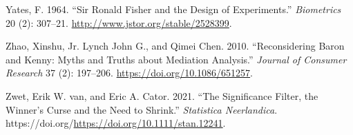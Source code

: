 \documentclass[
  11pt,
  letterpaper,
]{scrbook}
\newlength{\cslhangindent}
\newlength{\cslentryspacingunit} %
\newenvironment{CSLReferences}[2] %
 {%
  \setlength{\parindent}{0pt}
  \ifodd #1
  \let\oldpar\par
  \def\par{\hangindent=\cslhangindent\oldpar}
  \fi
  \setlength{\parskip}{#2\cslentryspacingunit}
 }%
 {}
\theoremstyle{definition}
\theoremstyle{remark}
\begin{document}
\begin{CSLReferences}{1}{0}
\leavevmode{}%
Yates, F. 1964. {``Sir {R}onald {F}isher and the Design of
Experiments.''} \emph{Biometrics} 20 (2): 307--21.
\url{http://www.jstor.org/stable/2528399}.

\leavevmode{}%
Zhao, Xinshu, Jr. Lynch John G., and Qimei Chen. 2010. {``Reconsidering
{B}aron and {K}enny: Myths and Truths about Mediation Analysis.''}
\emph{Journal of Consumer Research} 37 (2): 197--206.
\url{https://doi.org/10.1086/651257}.

\leavevmode{}%
Zwet, Erik W. van, and Eric A. Cator. 2021. {``The Significance Filter,
the Winner's Curse and the Need to Shrink.''} \emph{Statistica
Neerlandica}. https://doi.org/\url{https://doi.org/10.1111/stan.12241}.

\end{CSLReferences}


\backmatter
\end{document}
